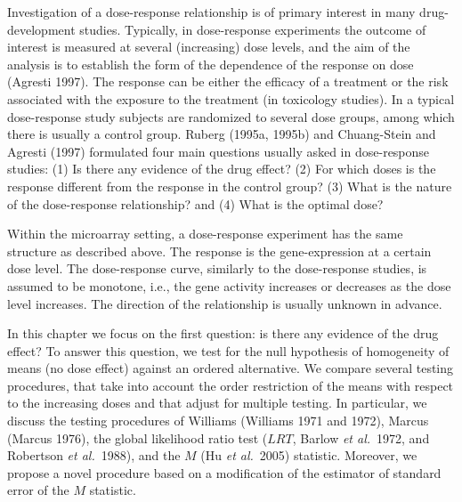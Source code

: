 \documentclass[10pt]{mybook4}
\begin{document}
Investigation of a dose-response relationship is of primary interest
in many drug-development studies. Typically, in dose-response
experiments the outcome of interest is measured at several
(increasing) dose levels, and the aim  of the analysis is to
establish the form of the dependence of the response on dose
(Agresti 1997). The response can be either the efficacy of a
treatment or the risk associated with the exposure to the treatment
(in toxicology studies). In a typical dose-response study subjects
are randomized to several dose groups, among which there is usually
a control group. Ruberg (1995a, 1995b) and Chuang-Stein and Agresti
(1997) formulated four main questions usually asked in dose-response
studies: (1) Is there any evidence of the drug effect? (2) For which
doses is the response different from the response in the control
group? (3) What is the nature of the dose-response relationship? and
(4) What is the optimal dose?

Within the microarray setting, a dose-response experiment has the
same structure as described above. The response is the
gene-expression at a certain dose level. The dose-response curve,
similarly to the dose-response studies, is assumed to be monotone,
i.e., the gene activity increases or decreases as the dose level
increases. The direction of the relationship is usually unknown in
advance.

In this chapter we focus on the first question: is there any
evidence of the drug effect? To answer this question, we test for
the null hypothesis of homogeneity of means (no dose effect) against
an ordered alternative. We compare several testing procedures, that
take into account the order restriction of the means with respect to
the increasing doses and that adjust for multiple testing. In
particular, we discuss the testing procedures of Williams (Williams
1971 and 1972), Marcus (Marcus 1976), the global likelihood ratio
test ($LRT$, Barlow \textit{et al.}\ 1972, and Robertson \textit{et
al.}\ 1988), and the $M$ (Hu \textit{et al.}\ 2005) statistic.
Moreover, we propose a novel procedure based on a modification of
the estimator of standard error of the $M$ statistic.
\end{document}

